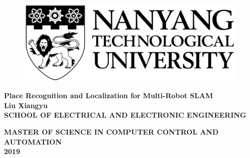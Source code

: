 \begin{titlepage}

\begin{figure}[H]
\centering
\includegraphics[scale=0.8]{Title/logo.eps}
\caption*{}
\label{fig:entropy} 
\end{figure}

\centering
\LARGE{\textbf{Place Recognition and Localization for Multi-Robot SLAM}}\\[2in]



\large{\textbf{Liu Xiangyu}}\\[1in]

\textbf{SCHOOL OF ELECTRICAL AND ELECTRONIC ENGINEERING}

\textbf{MASTER OF SCIENCE IN COMPUTER CONTROL AND AUTOMATION}\\[0.25in]

\textbf{2019}
\newpage
\end{titlepage}